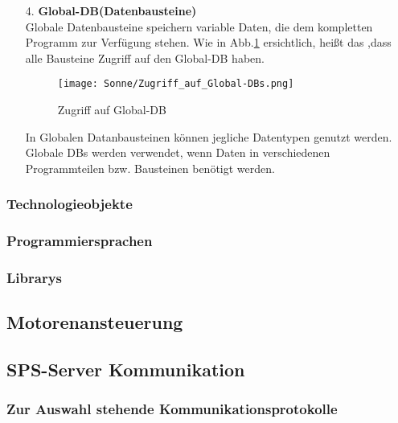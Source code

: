 \begin{itemize}
        \item[4.]   \textbf{Global-DB(Datenbausteine)} \\
            Globale Datenbausteine speichern variable Daten, die dem kompletten Programm zur Verfügung stehen. Wie in Abb.\ref{Zugriff auf Global-DB} ersichtlich, heißt das ,dass alle Bausteine Zugriff auf den Global-DB haben.

            \begin{figure}[h]
                \centering
                \texttt{[image: Sonne/Zugriff\_auf\_Global-DBs.png]}
                \caption{Zugriff auf Global-DB}
                \label{Zugriff auf Global-DB}
            \end{figure}

            In Globalen Datanbausteinen können jegliche Datentypen genutzt werden.\\
            Globale DBs werden verwendet, wenn Daten in verschiedenen Programmteilen bzw. Bausteinen benötigt werden.
            \cite{Programmierleitfaden_für_S7-1500}
    \end{itemize}

    \subsubsection{Technologieobjekte}

    \subsubsection{Programmiersprachen}

    \subsubsection{Librarys}
    \label{Libraryeinbindung}

\subsection{Motorenansteuerung}

\subsection{SPS-Server Kommunikation}

    \subsubsection{Zur Auswahl stehende Kommunikationsprotokolle} 
    \label{Kommunikationsprotokolle}

